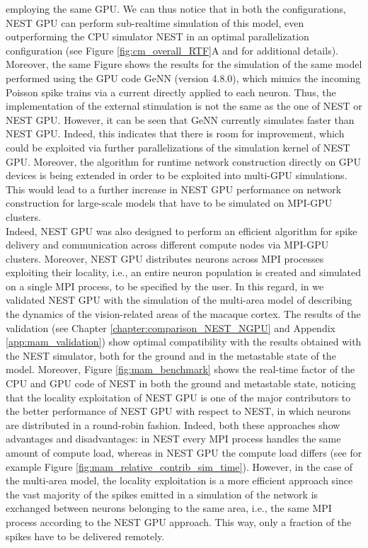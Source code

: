 \documentclass[a4paper, 12pt, twoside, openright]{book}
\begin{document}
employing the same GPU. We can thus notice that in both the configurations, NEST GPU can perform sub-realtime simulation of this model, even outperforming the CPU simulator NEST in an optimal parallelization configuration (see Figure \ref{fig:cm_overall_RTF}A and \cite{Kurth2022} for additional details). Moreover, the same Figure shows the results for the simulation of the same model performed using the GPU code GeNN (version 4.8.0), which mimics the incoming Poisson spike trains via a current directly applied to each neuron. Thus, the implementation of the external stimulation is not the same as the one of NEST or NEST GPU. However, it can be seen that GeNN currently simulates faster than NEST GPU. Indeed, this indicates that there is room for improvement, which could be exploited via further parallelizations of the simulation kernel of NEST GPU. Moreover, the algorithm for runtime network construction directly on GPU devices is being extended in order to be exploited into multi-GPU simulations. This would lead to a further increase in NEST GPU performance on network construction for large-scale models that have to be simulated on MPI-GPU clusters.\\
Indeed, NEST GPU was also designed to perform an efficient algorithm for spike delivery and communication across different compute nodes via MPI-GPU clusters. Moreover, NEST GPU distributes neurons across MPI processes exploiting their locality, i.e., an entire neuron population is created and simulated on a single MPI process, to be specified by the user.
In this regard, in \cite{Tiddia2022} we validated NEST GPU with the simulation of the multi-area model of \cite{Schmidt2018,Schmidt2018b} describing the dynamics of the vision-related areas of the macaque cortex. The results of the validation (see Chapter \ref{chapter:comparison_NEST_NGPU} and Appendix \ref{app:mam_validation}) show optimal compatibility with the results obtained with the NEST simulator, both for the ground and in the metastable state of the model. Moreover, Figure \ref{fig:mam_benchmark} shows the real-time factor of the CPU and GPU code of NEST in both the ground and metastable state, noticing that the locality exploitation of NEST GPU is one of the major contributors to the better performance of NEST GPU with respect to NEST, in which neurons are distributed in a round-robin fashion. Indeed, both these approaches show advantages and disadvantages: in NEST every MPI process handles the same amount of compute load, whereas in NEST GPU the compute load differs (see for example Figure \ref{fig:mam_relative_contrib_sim_time}). However, in the case of the multi-area model, the locality exploitation is a more efficient approach since the vast majority of the spikes emitted in a simulation of the network is exchanged between neurons belonging to the same area, i.e., the same MPI process according to the NEST GPU approach. This way, only a fraction of the spikes have to be delivered remotely. 
\end{document}
